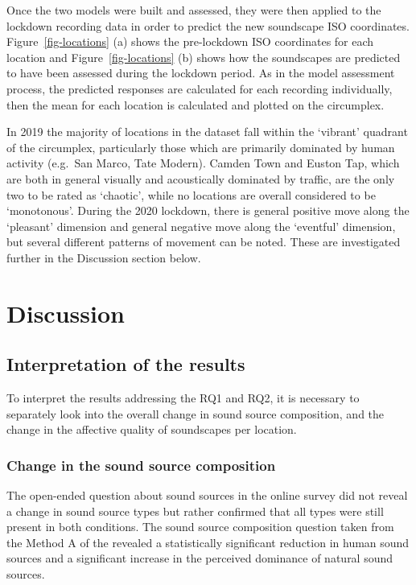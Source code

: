 \documentclass[
  authoryear,
  preprint,
  3p,
  onecolumn]{elsarticle}
\begin{document}
Once the two models were built and assessed, they were then applied to
the lockdown recording data in order to predict the new soundscape ISO
coordinates. Figure~\ref{fig-locations} (a) shows the pre-lockdown ISO
coordinates for each location and Figure~\ref{fig-locations} (b) shows
how the soundscapes are predicted to have been assessed during the
lockdown period. As in the model assessment process, the predicted
responses are calculated for each recording individually, then the mean
for each location is calculated and plotted on the circumplex.

In 2019 the majority of locations in the dataset fall within the
`vibrant' quadrant of the circumplex, particularly those which are
primarily dominated by human activity (e.g.~San Marco, Tate Modern).
Camden Town and Euston Tap, which are both in general visually and
acoustically dominated by traffic, are the only two to be rated as
`chaotic', while no locations are overall considered to be `monotonous'.
During the 2020 lockdown, there is general positive move along the
`pleasant' dimension and general negative move along the `eventful'
dimension, but several different patterns of movement can be noted.
These are investigated further in the Discussion section below.

\hypertarget{discussion}{%
\section{Discussion}\label{discussion}}

\hypertarget{interpretation-of-the-results}{%
\subsection{Interpretation of the
results}\label{interpretation-of-the-results}}

To interpret the results addressing the RQ1 and RQ2, it is necessary to
separately look into the overall change in sound source composition, and
the change in the affective quality of soundscapes per location.

\hypertarget{change-in-the-sound-source-composition}{%
\subsubsection{Change in the sound source
composition}\label{change-in-the-sound-source-composition}}

The open-ended question about sound sources in the online survey did not
reveal a change in sound source types but rather confirmed that all
types were still present in both conditions. The sound source
composition question taken from the Method A of the
\citet{ISO12913Part2} revealed a statistically significant reduction in
human sound sources and a significant increase in the perceived
dominance of natural sound sources.
\end{document}
